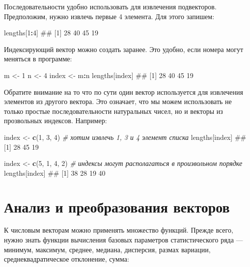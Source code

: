 \documentclass[]{book}
\newenvironment{Shaded}{\begin{snugshade}}{\end{snugshade}}
\newcommand{\KeywordTok}[1]{\textcolor[rgb]{0.13,0.29,0.53}{\textbf{#1}}}
\newcommand{\DecValTok}[1]{\textcolor[rgb]{0.00,0.00,0.81}{#1}}
\newcommand{\StringTok}[1]{\textcolor[rgb]{0.31,0.60,0.02}{#1}}
\newcommand{\CommentTok}[1]{\textcolor[rgb]{0.56,0.35,0.01}{\textit{#1}}}
\newcommand{\OperatorTok}[1]{\textcolor[rgb]{0.81,0.36,0.00}{\textbf{#1}}}
\newcommand{\NormalTok}[1]{#1}
\begin{document}
Последовательности удобно использовать для извлечения подвекторов.
Предположим, нужно извлечь первые 4 элемента. Для этого запишем:

\begin{Shaded}
\begin{Highlighting}[]
\NormalTok{lengths[}\DecValTok{1}\OperatorTok{:}\DecValTok{4}\NormalTok{]}
\NormalTok{## [1] 28 40 45 19}
\end{Highlighting}
\end{Shaded}

Индексирующий вектор можно создать заранее. Это удобно, если номера
могут меняться в программе:

\begin{Shaded}
\begin{Highlighting}[]
\NormalTok{m <-}\StringTok{ }\DecValTok{1}
\NormalTok{n <-}\StringTok{ }\DecValTok{4}
\NormalTok{index <-}\StringTok{ }\NormalTok{m}\OperatorTok{:}\NormalTok{n}
\NormalTok{lengths[index]}
\NormalTok{## [1] 28 40 45 19}
\end{Highlighting}
\end{Shaded}

Обратите внимание на то что по сути один вектор используется для
извлечения элементов из другого вектора. Это означает, что мы можем
использовать не только простые последовательности натуральных чисел, но
и векторы из прозвольных индексов. Например:

\begin{Shaded}
\begin{Highlighting}[]
\NormalTok{index <-}\StringTok{ }\KeywordTok{c}\NormalTok{(}\DecValTok{1}\NormalTok{, }\DecValTok{3}\NormalTok{, }\DecValTok{4}\NormalTok{) }\CommentTok{# хотим извлечь 1, 3 и 4 элемент списка}
\NormalTok{lengths[index]}
\NormalTok{## [1] 28 45 19}

\NormalTok{index <-}\StringTok{ }\KeywordTok{c}\NormalTok{(}\DecValTok{5}\NormalTok{, }\DecValTok{1}\NormalTok{, }\DecValTok{4}\NormalTok{, }\DecValTok{2}\NormalTok{) }\CommentTok{# индексы могут располагаться в произвольном порядке}
\NormalTok{lengths[index]}
\NormalTok{## [1] 38 28 19 40}
\end{Highlighting}
\end{Shaded}

\section{Анализ и преобразования векторов}\label{---}

К числовым векторам можно применять множество функций. Прежде всего,
нужно знать функции вычисления базовых параметров статистического ряда
--- минимум, максимум, среднее, медиана, дисперсия, размах вариации,
среднеквадратическое отклонение, сумма:
\end{document}
